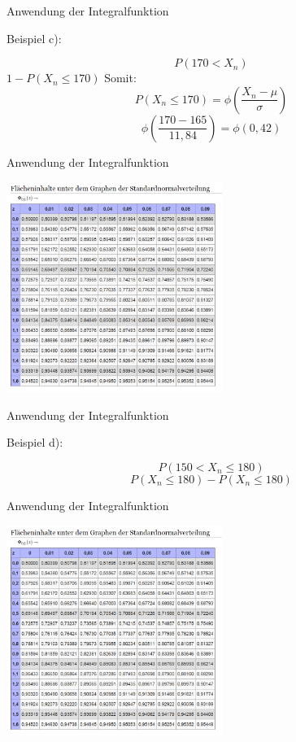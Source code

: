 \documentclass[14pt]{beamer}
\begin{document}
\begin{frame} {Anwendung der Integralfunktion}

Beispiel c):
 
 $$P(170 < X_n)$$
 $1 - P(X_n \le 170)$
 Somit: $$P(X_n \le 170) =  \phi\left(\frac{X_n - \mu}{\sigma}\right)$$
 $$ \phi\left(\frac{170 - 165}{11,84}\right) = \phi(0,42) $$

\end{frame}

\begin{frame} {Anwendung der Integralfunktion}
 
 \includegraphics[width=7.0cm]{TabelleNormalverteilung.png}

\end{frame}

\begin{frame} {Anwendung der Integralfunktion}

Beispiel d):
 
 $$P(150 < X_n \le 180)$$
 $$P(X_n \le 180) - P(X_n \le 180)$$

\end{frame}

\begin{frame} {Anwendung der Integralfunktion}
 
 \includegraphics[width=7.0cm]{TabelleNormalverteilung.png}

\end{frame}
\end{document}
